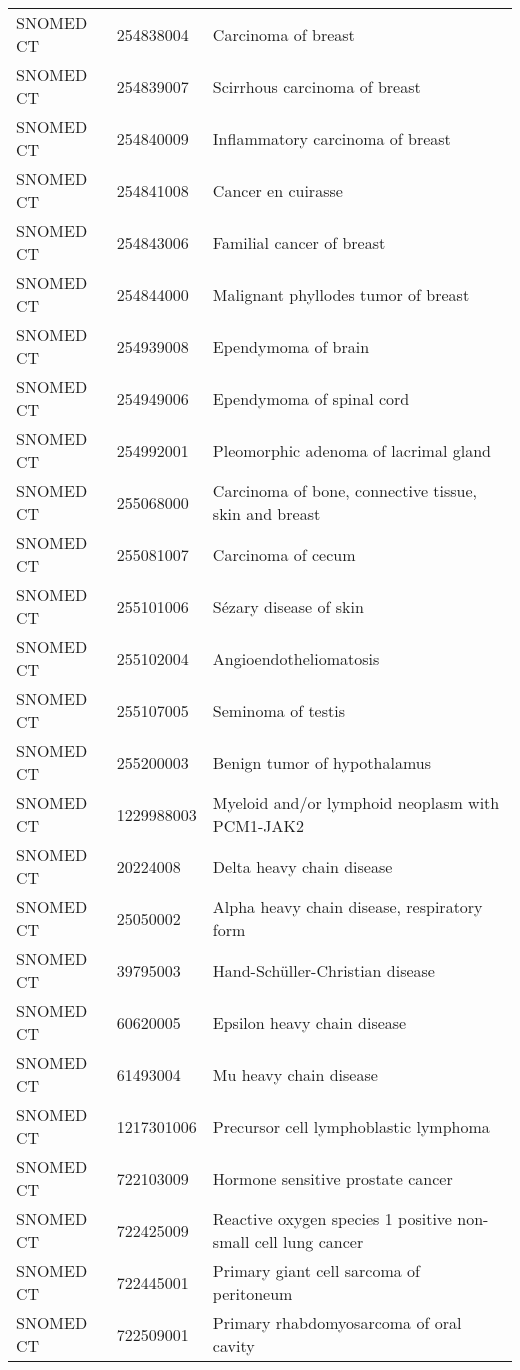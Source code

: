 \begin{longtable}{p{}p{}p{}}
  SNOMED CT & 254838004 & Carcinoma of breast \\ 
  SNOMED CT & 254839007 & Scirrhous carcinoma of breast \\ 
  SNOMED CT & 254840009 & Inflammatory carcinoma of breast \\ 
  SNOMED CT & 254841008 & Cancer en cuirasse \\ 
  SNOMED CT & 254843006 & Familial cancer of breast \\ 
  SNOMED CT & 254844000 & Malignant phyllodes tumor of breast \\ 
  SNOMED CT & 254939008 & Ependymoma of brain \\ 
  SNOMED CT & 254949006 & Ependymoma of spinal cord \\ 
  SNOMED CT & 254992001 & Pleomorphic adenoma of lacrimal gland \\ 
  SNOMED CT & 255068000 & Carcinoma of bone, connective tissue, skin and breast \\ 
  SNOMED CT & 255081007 & Carcinoma of cecum \\ 
  SNOMED CT & 255101006 & Sézary disease of skin \\ 
  SNOMED CT & 255102004 & Angioendotheliomatosis \\ 
  SNOMED CT & 255107005 & Seminoma of testis \\ 
  SNOMED CT & 255200003 & Benign tumor of hypothalamus \\ 
  SNOMED CT & 1229988003 & Myeloid and/or lymphoid neoplasm with PCM1-JAK2 \\ 
  SNOMED CT & 20224008 & Delta heavy chain disease \\ 
  SNOMED CT & 25050002 & Alpha heavy chain disease, respiratory form \\ 
  SNOMED CT & 39795003 & Hand-Schüller-Christian disease \\ 
  SNOMED CT & 60620005 & Epsilon heavy chain disease \\ 
  SNOMED CT & 61493004 & Mu heavy chain disease \\ 
  SNOMED CT & 1217301006 & Precursor cell lymphoblastic lymphoma \\ 
  SNOMED CT & 722103009 & Hormone sensitive prostate cancer \\ 
  SNOMED CT & 722425009 & Reactive oxygen species 1 positive non-small cell lung cancer \\ 
  SNOMED CT & 722445001 & Primary giant cell sarcoma of peritoneum \\ 
  SNOMED CT & 722509001 & Primary rhabdomyosarcoma of oral cavity \\ 

\end{longtable}
